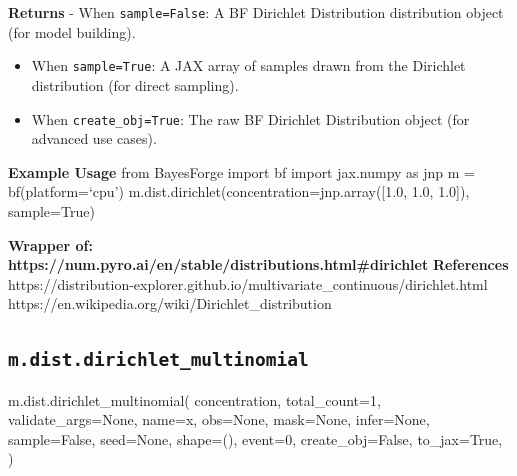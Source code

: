 \documentclass[
  letterpaper,
  DIV=11,
  numbers=noendperiod]{scrartcl}
\newenvironment{Shaded}{\begin{snugshade}}{\end{snugshade}}
\newcommand{\DecValTok}[1]{\textcolor[rgb]{0.68,0.00,0.00}{#1}}
\newcommand{\NormalTok}[1]{\textcolor[rgb]{0.00,0.23,0.31}{#1}}
\newcommand{\OperatorTok}[1]{\textcolor[rgb]{0.37,0.37,0.37}{#1}}
\newcommand{\StringTok}[1]{\textcolor[rgb]{0.13,0.47,0.30}{#1}}
\newcommand{\VariableTok}[1]{\textcolor[rgb]{0.07,0.07,0.07}{#1}}
\begin{document}
\textbf{Returns} - When \texttt{sample=False}: A BF Dirichlet
Distribution distribution object (for model building).

\begin{itemize}
\item
  When \texttt{sample=True}: A JAX array of samples drawn from the
  Dirichlet distribution (for direct sampling).
\item
  When \texttt{create\_obj=True}: The raw BF Dirichlet Distribution
  object (for advanced use cases).
\end{itemize}

\textbf{Example Usage} from BayesForge import bf import jax.numpy as jnp
m = bf(platform=`cpu') m.dist.dirichlet(concentration=jnp.array({[}1.0,
1.0, 1.0{]}), sample=True)

\textbf{Wrapper of:
https://num.pyro.ai/en/stable/distributions.html\#dirichlet}
\textbf{References}
https://distribution-explorer.github.io/multivariate\_continuous/dirichlet.html
https://en.wikipedia.org/wiki/Dirichlet\_distribution

\subsection{\texorpdfstring{\texttt{m.dist.dirichlet\_multinomial}}{m.dist.dirichlet\_multinomial}}\label{dirichlet_multinomial}

\begin{Shaded}
\begin{Highlighting}[]
\NormalTok{m.dist.dirichlet\_multinomial(}
\NormalTok{    concentration,}
\NormalTok{    total\_count}\OperatorTok{=}\DecValTok{1}\NormalTok{,}
\NormalTok{    validate\_args}\OperatorTok{=}\VariableTok{None}\NormalTok{,}
\NormalTok{    name}\OperatorTok{=}\StringTok{\textquotesingle{}x\textquotesingle{}}\NormalTok{,}
\NormalTok{    obs}\OperatorTok{=}\VariableTok{None}\NormalTok{,}
\NormalTok{    mask}\OperatorTok{=}\VariableTok{None}\NormalTok{,}
\NormalTok{    infer}\OperatorTok{=}\VariableTok{None}\NormalTok{,}
\NormalTok{    sample}\OperatorTok{=}\VariableTok{False}\NormalTok{,}
\NormalTok{    seed}\OperatorTok{=}\VariableTok{None}\NormalTok{,}
\NormalTok{    shape}\OperatorTok{=}\NormalTok{(),}
\NormalTok{    event}\OperatorTok{=}\DecValTok{0}\NormalTok{,}
\NormalTok{    create\_obj}\OperatorTok{=}\VariableTok{False}\NormalTok{,}
\NormalTok{    to\_jax}\OperatorTok{=}\VariableTok{True}\NormalTok{,}
\NormalTok{)}
\end{Highlighting}
\end{Shaded}
\end{document}
